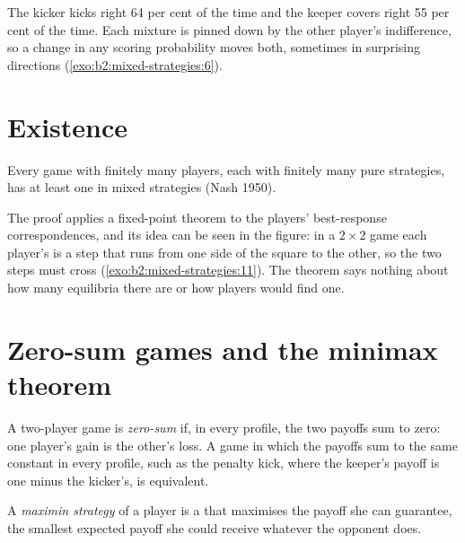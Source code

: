 The kicker kicks right 64 per cent of the time and the keeper covers right 55 per cent of the time. Each
mixture is pinned down by the other player's indifference, so a change in any scoring probability moves both,
sometimes in surprising directions (\cref{exo:b2:mixed-strategies:6}).

\section{Existence}\label{sec:b2:mixed-strategies:existence}

\begin{theorem}\label{thm:b2:mixed-strategies:nash}
Every game with finitely many players, each with finitely many pure strategies, has at least one  in mixed strategies (Nash 1950).
\end{theorem}

\admitted

The proof applies a fixed-point theorem to the players' best-response correspondences, and its idea can be
seen in the figure: in a $2 \times 2$ game each player's  is a step that runs from one side of the
square to the other, so the two steps must cross (\cref{exo:b2:mixed-strategies:11}). The theorem says
nothing about how many equilibria there are or how players would find one.

\section{Zero-sum games and the minimax theorem}\label{sec:b2:mixed-strategies:minimax}

\begin{definition}\label{def:b2:mixed-strategies:zero-sum}
A two-player game is \emph{zero-sum} if, in every profile, the two payoffs sum to zero:
one player's gain is the other's loss. A game in which the payoffs sum to the same constant in every profile,
such as the penalty kick, where the keeper's payoff is one minus the kicker's, is equivalent.
\end{definition}

\begin{definition}\label{def:b2:mixed-strategies:maximin}
A \emph{maximin strategy} of a player is a  that maximises the payoff
she can guarantee, the smallest expected payoff she could receive whatever the opponent does.
\end{definition}

